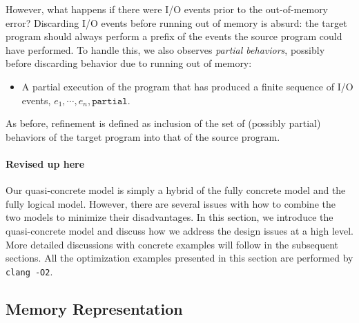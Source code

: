 


However, what happens if there were I/O events prior to the out-of-memory error?  Discarding I/O
events before running out of memory is absurd: the target program should always perform a prefix of
the events the source program could have performed.  To handle this, we also observes \emph{partial
  behaviors}, possibly before discarding behavior due to running out of memory:


\begin{itemize}
\item A partial execution of the program that has produced a finite sequence
of I/O events, $e_1, \cdots, e_n, \mathtt{partial}$.
\end{itemize}
As before, refinement is defined as inclusion of the set of (possibly partial) behaviors of the
target program into that of the source program.


\paragraph{Revised up here}

Our quasi-concrete model is simply a hybrid of the fully concrete
model and the fully logical model. However, there are several issues
with how to combine the two models to minimize their disadvantages.
In this section, we introduce the quasi-concrete model and discuss how
we address the design issues at a high level.  More detailed
discussions with concrete examples will follow in the subsequent
sections.  All the optimization examples presented in this
section are performed by \texttt{clang -O2}.

\subsection{Memory Representation}

